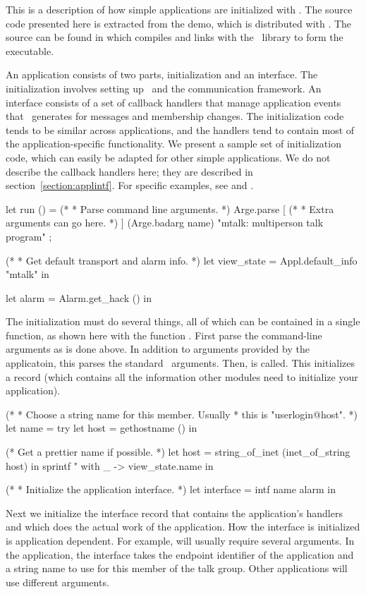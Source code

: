 This is a description of how simple applications are initialized with
\ensemble.  The source code presented here is extracted from the
 demo, which is distributed with \ensemble.  The source
can be found in  which compiles and links with
the \ensemble\ library to form the  executable.

An application consists of two parts, initialization and an interface.
The initialization involves setting up \ensemble\ and the
communication framework.  An interface consists of a set of callback
handlers that manage application events that \ensemble\ generates for
messages and membership changes.  The initialization code tends to be
similar across applications, and the handlers tend to contain most of
the application-specific functionality.  We present a sample set of
initialization code, which can easily be adapted for other simple
applications.  We do not describe the callback handlers here; they are
described in section~\ref{section:applintf}.  For specific examples,
see  and .

\begin{codebox}
let run () =
  (*
   * Parse command line arguments.
   *)
  Arge.parse [
    (*
     * Extra arguments can go here.
     *)
  ] (Arge.badarg name) "mtalk: multiperson talk program" ;

  (*
   * Get default transport and alarm info.
   *)
  let view_state = Appl.default_info "mtalk" in

  let alarm = Alarm.get_hack () in
\end{codebox}
The initialization must do several things, all of which can be
contained in a single function, as shown here with the function
.  First parse the command-line arguments as is done above.
In addition to arguments provided by the applicatoin, this parses the
standard \ensemble\ arguments.  Then,  is called.
This initializes a  record (which contains all the
information other modules need to initialize your application).

\begin{codebox}    
  (*
   * Choose a string name for this member.  Usually
   * this is "userlogin@host".
   *)
  let name =
    try
      let host = gethostname () in

      (* Get a prettier name if possible.
       *)
      let host = string_of_inet (inet_of_string host) in
      sprintf "%
    with _ -> view_state.name
  in

  (*
   * Initialize the application interface.
   *)
  let interface = intf name alarm in
\end{codebox}    
Next we initialize the interface record that contains the
application's handlers and which does the actual work of the
application.  How the interface is initialized is application
dependent.  For example,  will usually require
several arguments.  In the  application, the interface
takes the endpoint identifier of the application and a string name to
use for this member of the talk group.  Other applications will use
different arguments.

